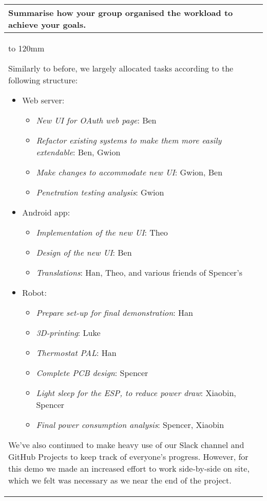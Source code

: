 \documentclass[a4paper]{article}
\newcommand{\colWidth}{141mm}
\begin{document}
\begin{center}
\begin{tabular}{|p{\colWidth}|}
	\hline
	\cellcolor{blue!25}\large
	\textbf{Summarise how your group organised the workload to achieve your goals.}
	\\ \hline
	\vtop to 120mm{
		Similarly to before, we largely allocated tasks according to the following structure:
		\begin{itemize}
			\item Web server:
			\begin{itemize}
				\item \textit{New UI for OAuth web page}: Ben
				\item \textit{Refactor existing systems to make them more easily extendable}: Ben, Gwion
				\item \textit{Make changes to accommodate new UI}: Gwion, Ben
				\item \textit{Penetration testing analysis}: Gwion
			\end{itemize}
			\item Android app:
			\begin{itemize}
				\item \textit{Implementation of the new UI}: Theo
				\item \textit{Design of the new UI}: Ben
				\item \textit{Translations}: Han, Theo, and various friends of Spencer's
			\end{itemize}
			\item Robot:
			\begin{itemize}
				\item \textit{Prepare set-up for final demonstration}: Han
				\item \textit{3D-printing}: Luke
				\item \textit{Thermostat PAL}: Han
				\item \textit{Complete PCB design}: Spencer
				\item \textit{Light sleep for the ESP, to reduce power draw}: Xiaobin, Spencer
				\item \textit{Final power consumption analysis}: Spencer, Xiaobin
			\end{itemize}
		\end{itemize}

		We've also continued to make heavy use of our Slack channel and GitHub Projects to keep track of
		everyone's progress. However, for this demo we made an increased effort to work side-by-side on site, which we felt was
		necessary as we near the end of the project.
  }
  \\
  \hline
\end{tabular}
\vskip 5mm


\end{center}
\end{document}

